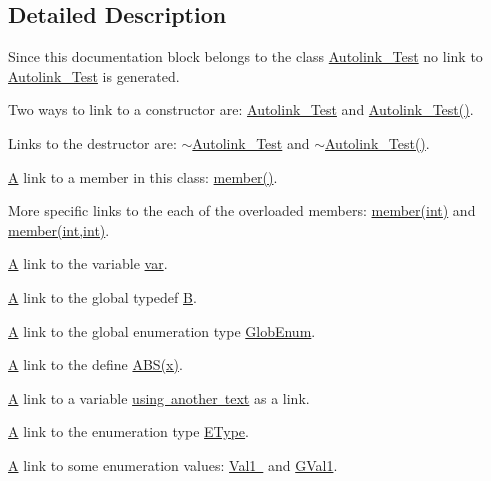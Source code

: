 \subsection{Detailed Description}
Since this documentation block belongs to the class \mbox{\hyperlink{class_autolink___test}{Autolink\+\_\+\+Test}} no link to \mbox{\hyperlink{class_autolink___test}{Autolink\+\_\+\+Test}} is generated.

Two ways to link to a constructor are\+: \mbox{\hyperlink{class_autolink___test}{Autolink\+\_\+\+Test}} and \mbox{\hyperlink{class_autolink___test_a278d631f9943428c05b17d78f14488e2}{Autolink\+\_\+\+Test()}}.

Links to the destructor are\+: \mbox{\hyperlink{class_autolink___test_a03bf46c8e2b733680035f524fd7b193b}{$\sim$\+Autolink\+\_\+\+Test}} and \mbox{\hyperlink{class_autolink___test_a03bf46c8e2b733680035f524fd7b193b}{$\sim$\+Autolink\+\_\+\+Test()}}.

\mbox{\hyperlink{class_a}{A}} link to a member in this class\+: \mbox{\hyperlink{class_autolink___test_a393ea281f235a2f603d98daf72b0d411}{member()}}.

More specific links to the each of the overloaded members\+: \mbox{\hyperlink{class_autolink___test_a393ea281f235a2f603d98daf72b0d411}{member(int)}} and \mbox{\hyperlink{class_autolink___test_acf783a43c2b4b6cc9dd2361784eca2e1}{member(int,int)}}.

\mbox{\hyperlink{class_a}{A}} link to the variable \mbox{\hyperlink{class_autolink___test_a8de85603114bc9b9e53bd40764e9b499}{var}}.

\mbox{\hyperlink{class_a}{A}} link to the global typedef \mbox{\hyperlink{class_b}{B}}.

\mbox{\hyperlink{class_a}{A}} link to the global enumeration type \mbox{\hyperlink{autolink_8cpp_a656d63cf384d2a6f23c2c18523a7bc5e}{Glob\+Enum}}.

\mbox{\hyperlink{class_a}{A}} link to the define \mbox{\hyperlink{autolink_8cpp_a996f7be338ccb40d1a2a5abc1ad61759}{A\+B\+S(x)}}.

\mbox{\hyperlink{class_a}{A}} link to a variable \mbox{\hyperlink{class_autolink___test_a8de85603114bc9b9e53bd40764e9b499}{using another text}} as a link.

\mbox{\hyperlink{class_a}{A}} link to the enumeration type \mbox{\hyperlink{class_autolink___test_aeb611627c332d067bded1806b1bb45c2}{E\+Type}}.

\mbox{\hyperlink{class_a}{A}} link to some enumeration values\+: \mbox{\hyperlink{class_autolink___test_aeb611627c332d067bded1806b1bb45c2af70631e295bce280e74762d18af47a94}{Val1 }} and \mbox{\hyperlink{autolink_8cpp_a656d63cf384d2a6f23c2c18523a7bc5ea0f016f49e4f3bcd072319b9d68bc927d}{G\+Val1}}.

